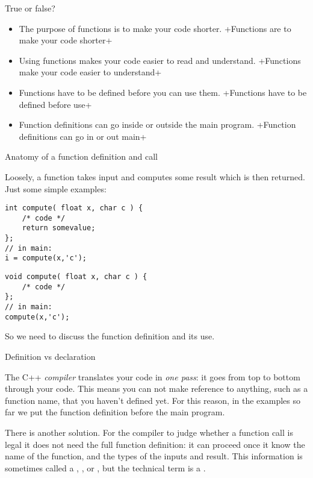 \begin{review}
  \label{rev:func-why}
  True or false?
  \begin{itemize}
  \item The purpose of functions is to make your code shorter.
    \slackpollTF+Functions are to make your code shorter+
  \item Using functions makes your code easier to read and understand.
    \slackpollTF+Functions make your code easier to understand+
  \item Functions have to be defined before you can use them.
    \slackpollTF+Functions have to be defined before use+
  \item Function definitions can go inside or outside the main program.
    \slackpollTF+Function definitions can go in or out main+
  \end{itemize}
\end{review}

 {Anatomy of a function definition and call}

Loosely, a function takes input and computes some result which is then returned.
Just some simple examples:

\begin{multicols}{2}
\begin{lstlisting}
int compute( float x, char c ) {
    /* code */
    return somevalue;
};
// in main:
i = compute(x,'c');
\end{lstlisting}
\columnbreak
\begin{lstlisting}
void compute( float x, char c ) {
    /* code */
};
// in main:
compute(x,'c');
\end{lstlisting}
\end{multicols}

So we need to discuss the function definition and its use.


 {Definition vs declaration}

The C++ \emph{compiler} translates your code in
\emph{one pass}: it goes from top to
bottom through your code. This means you can not make reference to
anything, such as a function name, that you haven't defined yet.
For this reason, in the examples so far we put the function definition
before the main program.

There is another solution.
For the compiler to judge whether a function call is legal
it does not need the full function definition:
it can proceed once it know the name of the function, and the types of
the inputs and result.
This information is sometimes called a
,
,
or ,
but the technical term is a .

